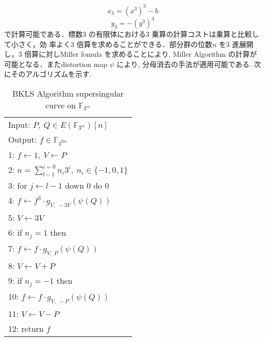 \vspace{-3mm}
\[
x_3 = (x^3)^3 - b
\]
\vspace{-5mm}
\[
y_3 = - (y^3)^3
\]
\vspace{-3mm}
で計算可能である．標数3 の有限体における3 乗算の計算コストは乗算と比較して小さく，効
率よく3 倍算を求めることができる．部分群の位数$n$ を3 進展開し，3 倍算に対しMiller fomula を求めることにより, Miller Algorithm の計算が可能となる．またdistortion map $\psi$ により, 分母消去の手法が適用可能である. 次にそのアルゴリズムを示す. 
\begin{table}[htbp]
 \begin{center}
  \begin{tabular}{|l|}
     \hline
     Input: $P,\ Q \in E(\mathbb{F}_{3^m})[n]$\\
     Output: $f \in \mathbb{F}_{3^{6m}}$\\
     \hline
     1: \quad $f \gets 1,\ V \gets P$\\
     2: \quad $n=\sum_{l-1}^{i=0} n_i 3^i, \ n_i \in \{-1,0,1\}$\\
     3: \quad for $j \gets l-1$ down 0 do 0\\
     4: \quad \quad $f \gets f^3 \cdot g_{V,\ -3V}(\psi (Q))$\\
     5: \quad \quad $V \gets 3V$\\
     6: \quad if $n_j = 1$ then\\
     7: \quad \quad $f \gets f \cdot g_{V,\ P}(\psi (Q))$\\
     8: \quad \quad $V \gets V+P$\\
     9: \quad if $n_j = -1$ then\\
     10: \quad \quad $f \gets f \cdot g_{V,\ -P}(\psi (Q))$\\
     11: \quad \quad $V \gets V-P$\\
     12: \quad return $f$\\
     \hline
   \end{tabular}
 \end{center}
 \caption{BKLS Algorithm supersingular curve on $\mathbb{F}_{3^m}$}
\end{table}
\par
\clearpage
